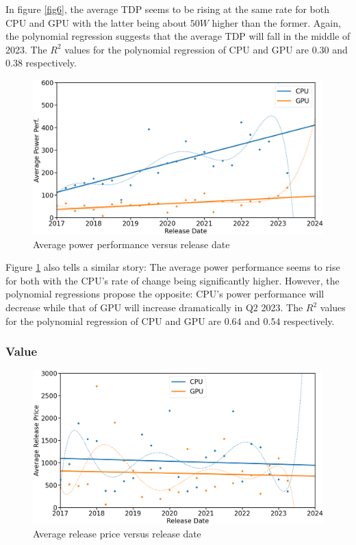 \documentclass[conference]{IEEEtran}
\begin{document}
In figure \ref{fig6}, the average TDP seems to be rising at the same rate
for both CPU and GPU with the latter being about $50W$ higher than the former.
Again, the polynomial regression suggests that the average TDP will fall in the
middle of 2023. The $R^{2}$ values for the polynomial regression of CPU
and GPU are $0.30$ and $0.38$ respectively.

\begin{figure}[htbp]
	\centerline{\includegraphics[width=\columnwidth]{avg_power_reg.png}}
	\caption{Average power performance versus release date}
	\label{fig7}
\end{figure}

Figure \ref{fig7} also tells a similar story: The average power performance
seems to rise for both with the CPU's rate of change being significantly higher.
However, the polynomial regressions propose the opposite: CPU's power
performance will decrease while that of GPU will increase dramatically in Q2
2023. The $R^{2}$ values for the polynomial regression of CPU
and GPU are $0.64$ and $0.54$ respectively.

\subsubsection{Value}
\begin{figure}[htbp]
	\centerline{\includegraphics[width=\columnwidth]{avg_release_price_reg.png}}
	\caption{Average release price versus release date}
	\label{fig8}
\end{figure}
\end{document}
